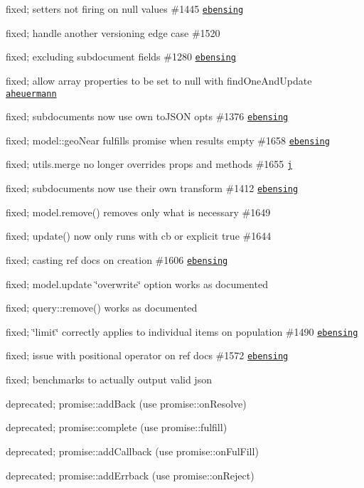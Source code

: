 \begin{DoxyItemize}
\item fixed; setters not firing on null values \#1445 \href{https://github.com/ebensing}{\tt ebensing}
\item fixed; handle another versioning edge case \#1520
\item fixed; excluding subdocument fields \#1280 \href{https://github.com/ebensing}{\tt ebensing}
\item fixed; allow array properties to be set to null with find\+One\+And\+Update \href{https://github.com/aheuermann}{\tt aheuermann}
\item fixed; subdocuments now use own to\+J\+S\+ON opts \#1376 \href{https://github.com/ebensing}{\tt ebensing}
\item fixed; model\+::geo\+Near fulfills promise when results empty \#1658 \href{https://github.com/ebensing}{\tt ebensing}
\item fixed; utils.\+merge no longer overrides props and methods \#1655 \href{https://github.com/j}{\tt j}
\item fixed; subdocuments now use their own transform \#1412 \href{https://github.com/ebensing}{\tt ebensing}
\item fixed; model.\+remove() removes only what is necessary \#1649
\item fixed; update() now only runs with cb or explicit true \#1644
\item fixed; casting ref docs on creation \#1606 \href{https://github.com/ebensing}{\tt ebensing}
\item fixed; model.\+update \char`\"{}overwrite\char`\"{} option works as documented
\item fixed; query\+::remove() works as documented
\item fixed; \char`\"{}limit\char`\"{} correctly applies to individual items on population \#1490 \href{https://github.com/ebensing}{\tt ebensing}
\item fixed; issue with positional operator on ref docs \#1572 \href{https://github.com/ebensing}{\tt ebensing}
\item fixed; benchmarks to actually output valid json
\item deprecated; promise\+::add\+Back (use promise\+::on\+Resolve)
\item deprecated; promise\+::complete (use promise\+::fulfill)
\item deprecated; promise\+::add\+Callback (use promise\+::on\+Ful\+Fill)
\item deprecated; promise\+::add\+Errback (use promise\+::on\+Reject)

\end{DoxyItemize}
